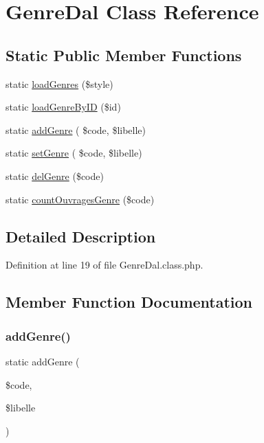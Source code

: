 \hypertarget{class_genre_dal}{}\section{Genre\+Dal Class Reference}
\label{class_genre_dal}
\subsection*{Static Public Member Functions}
\begin{DoxyCompactItemize}
\item 
static \hyperlink{class_genre_dal_a2f593b6941ef3a8e74cbade10d97935b}{load\+Genres} (\$style)
\item 
static \hyperlink{class_genre_dal_accf9d9f0e125c11bf0f771c169a0b582}{load\+Genre\+By\+ID} (\$id)
\item 
static \hyperlink{class_genre_dal_ae23e2a655a7711445afd4c3fa6849d3e}{add\+Genre} ( \$code, \$libelle)
\item 
static \hyperlink{class_genre_dal_a144dfb663ffd0988d949eef2eb2c97e8}{set\+Genre} ( \$code, \$libelle)
\item 
static \hyperlink{class_genre_dal_aa980c22187323f1df68f295d6d018aaf}{del\+Genre} (\$code)
\item 
static \hyperlink{class_genre_dal_aa1c5c4d06963df032b7cf34d9b56c02e}{count\+Ouvrages\+Genre} (\$code)
\end{DoxyCompactItemize}


\subsection{Detailed Description}


Definition at line 19 of file Genre\+Dal.\+class.\+php.



\subsection{Member Function Documentation}
\mbox{\label{class_genre_dal_ae23e2a655a7711445afd4c3fa6849d3e}} 
\subsubsection{\texorpdfstring{add\+Genre()}{addGenre()}}
{\footnotesize\ttfamily static add\+Genre (\begin{DoxyParamCaption}\item[{}]{\$code,  }\item[{}]{\$libelle }\end{DoxyParamCaption})\hspace{0.3cm}{\ttfamily [static]}}

